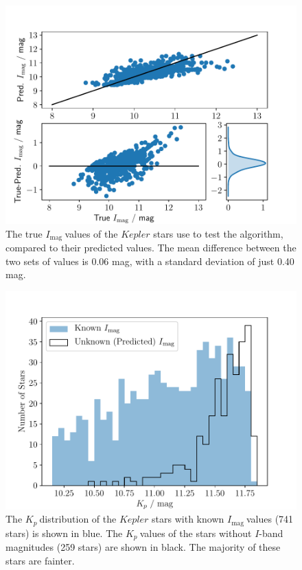 \documentclass[a4paper,fleqn,usenatbib,useAMS]{mnras}
\newcommand{\kp}{\ensuremath{K_{p}\:}}
\newcommand{\imag}{\ensuremath{I_{\textrm{mag}}\:}}
\begin{document}
\begin{figure}
	\centering
	\includegraphics[scale=0.5]{Plot4_Imag_scatter}
	\caption{The true \imag values of the $Kepler$ stars use to test the algorithm, compared to their predicted values. The mean difference between the two sets of values is 0.06 mag, with a standard deviation of just 0.40 mag.}	
	\label{fig:imag test scatter}
\end{figure}
\begin{figure}
	\centering
	\includegraphics[scale=0.5]{Plot3_Kp_distribution}
	\caption{The \kp distribution of the $Kepler$ stars with known \imag values (741 stars) is shown in blue. The \kp values of the stars without $I$-band magnitudes (259 stars) are shown in black. The majority of these stars are fainter.}	
	\label{fig:Kp}
\end{figure}
\end{document}
